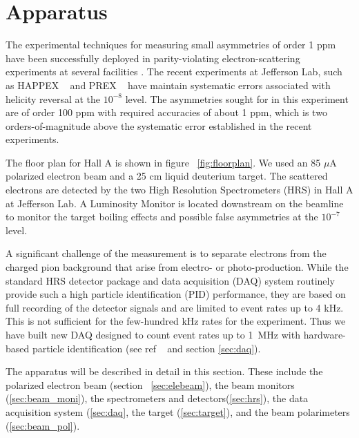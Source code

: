 
\section{Apparatus}\label{sec:apparatus}

\par The experimental techniques for measuring small 
asymmetries of order 1 ppm have been successfully deployed in
parity-violating electron-scattering experiments at several
facilities \cite{SLAC,bates,mainz1,happex,g0,prex,qweak,mainz2}.
The recent experiments at Jefferson Lab, such as HAPPEX ~\cite{happex}
and PREX ~\cite{prex} have maintain systematic errors associated with helicity
reversal at the $10^{-8}$ level.
The asymmetries sought for in this experiment are of order 100 ppm with
required accuracies of about 1 ppm, which is two orders-of-magnitude 
above the systematic error established in the recent experiments.

The floor plan for Hall A is shown in figure ~\ref{fig:floorplan}.
We used an 85 $\mu$A polarized electron beam and a 25 cm liquid
deuterium target.  The scattered electrons are detected by the two
High Resolution Spectrometers (HRS) in Hall A at Jefferson Lab.
A Luminosity Monitor is located downstream on the beamline to monitor 
the target boiling effects and possible false asymmetries at the $10^{-7}$ 
level.  

A significant challenge of the measurement 
is to separate electrons from the charged pion background 
that arise from electro- or photo-production. 
While the standard HRS detector package and data 
acquisition (DAQ) system routinely provide 
such a high particle identification (PID) performance, 
they are based on full recording 
of the detector signals and are limited to event rates up to 4 kHz.
This is not sufficient for the few-hundred kHz rates 
for the experiment. 
Thus we have built new DAQ designed to count event 
rates up to 1~MHz with hardware-based 
particle identification (see ref ~\cite{pvdis_nim} and section \ref{sec:daq}).

The apparatus will be described in detail in this section.
These include the polarized electron beam
(section ~\ref{sec:elebeam}), the beam monitors (\ref{sec:beam_moni}), 
the spectrometers and detectors(\ref{sec:hrs}), 
the data acquisition system (\ref{sec:daq}, 
the target (\ref{sec:target}),
and the beam polarimeters (\ref{sec:beam_pol}).


